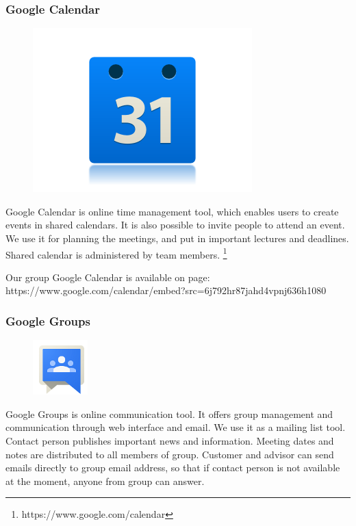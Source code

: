 \subsubsection{Google Calendar}

\begin{figure}
\vspace{-30pt}
\centering
\includegraphics[width = .20\textwidth]{image/calendar-logo.png}
\end{figure}

Google Calendar is online time management tool, which enables users to create events in shared calendars. It is also possible to invite people to attend an event. We use it for planning the meetings, and put in important lectures and deadlines. Shared calendar is administered by team members.
\footnote{https://www.google.com/calendar}

Our group Google Calendar is available on page:
https://www.google.com/calendar/embed?src=6j792hr87jahd4vpnj636h1080%

\subsubsection{Google Groups}

\begin{figure}
\vspace{-30pt}
\centering
\includegraphics[width = .20\textwidth]{image/groups-logo.png}
\end{figure}

Google Groups is online communication tool. It offers group management and communication through web interface and email. We use it as a mailing list tool. Contact person publishes important news and information. Meeting dates and notes are distributed to all members of group. Customer and advisor can send emails directly to group email address, so that if contact person is not available at the moment, anyone from group can answer.

